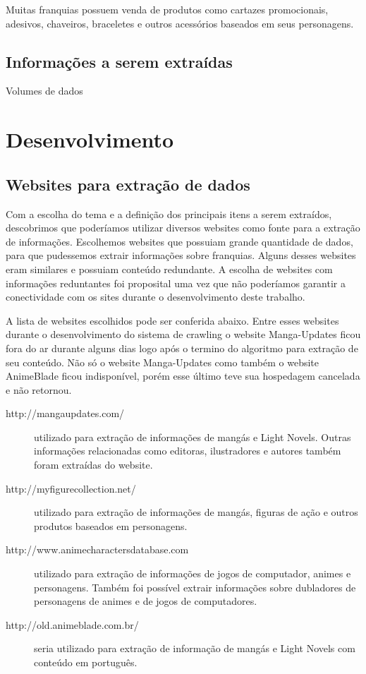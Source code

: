 \documentclass[12pt]{article}
\begin{document}
Muitas franquias possuem venda de produtos como cartazes promocionais, adesivos, chaveiros, braceletes e outros acessórios baseados em seus personagens.


\subsection{Informações a serem extraídas}

Volumes de dados

\section{Desenvolvimento}

\subsection{Websites para extração de dados}

Com a escolha do tema e a definição dos principais itens a serem extraídos, descobrimos que poderíamos utilizar diversos websites como fonte para a extração de informações. 
Escolhemos websites que possuiam grande quantidade de dados, para que pudessemos extrair informações sobre franquias. Alguns desses websites eram similares e possuiam conteúdo redundante. A escolha de websites com informações reduntantes foi proposital uma vez que não poderíamos garantir a conectividade com os sites durante o desenvolvimento deste trabalho.

A lista de websites escolhidos pode ser conferida abaixo. Entre esses websites durante o desenvolvimento do sistema de crawling o website Manga-Updates ficou fora do ar durante alguns dias logo após o termino do algoritmo para extração de seu conteúdo. Não só o website Manga-Updates como também o website AnimeBlade ficou indisponível, porém esse último teve sua hospedagem cancelada e não retornou.

\begin{description}
\item[http://mangaupdates.com/] utilizado para extração de informações de mangás e Light Novels. Outras informações relacionadas como editoras, ilustradores e autores também foram extraídas do website.
\item[http://myfigurecollection.net/] utilizado para extração de informações de mangás, figuras de ação e outros produtos baseados em personagens.
\item[http://www.animecharactersdatabase.com] utilizado para extração de informações de jogos de computador, animes e personagens. Também foi possível extrair informações sobre dubladores de personagens de animes e de jogos de computadores. 
\item[http://old.animeblade.com.br/] seria utilizado para extração de informação de mangás e Light Novels com conteúdo em português.
\end{description}
\end{document}
